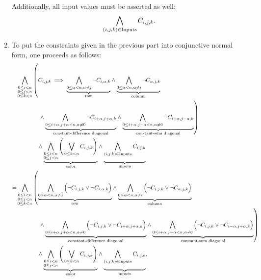 \documentclass[journal,onecolumn]{IEEEtran}
\begin{document}
\begin{enumerate}
	Additionally, all input values must be asserted as well:
	\[
	\bigwedge_{(i, j, k) \in \textnormal{Inputs}} C_{i, j, k}.
	\]
	\item To put the constraints given in the previous part into conjunctive normal form, one proceeds as follows:
	\begin{align*}
	&\bigwedge_{\substack{0 \le i < n \\ 0 \le j < n \\ 0 \le k < n}} \left(C_{i, j, k} \implies {\underbrace{\bigwedge_{0 \le \alpha < n, \alpha \ne j} \lnot C_{i, \alpha, k}}_{\textnormal{row}}} \land {\underbrace{\bigwedge_{0 \le \alpha < n, \alpha \ne i} \lnot C_{\alpha, j, k}}_{\textnormal{column}}}\right. \\
	&\left. \qquad \qquad \! \! {} \land {\underbrace{\bigwedge_{0 \le i+\alpha, j+\alpha < n, \alpha \ne 0} \lnot C_{i+\alpha, j+\alpha, k}}_{\textnormal{constant-difference diagonal}}} \land {\underbrace{\bigwedge_{0 \le i+\alpha, j-\alpha < n, \alpha \ne 0} \lnot C_{i+\alpha, j-\alpha, k}}_{\textnormal{constant-sum diagonal}}}\right) \\
	&\qquad \qquad \! \! {} \land {\underbrace{\bigwedge_{\substack{0 \le i < n \\ 0 \le j < n}} \Bigg(\bigvee_{0 \le k < n} C_{i, j, k}\Bigg)}_{\textnormal{color}}} \land {\underbrace{\bigwedge_{(i, j, k) \in \textnormal{Inputs}} C_{i, j, k} \vphantom{\bigwedge_{\substack{0 \le j < n \\ 0 \le k < n}}}}_{\textnormal{inputs}}} \\
	=&\bigwedge_{\substack{0 \le i < n \\ 0 \le j < n \\ 0 \le k < n}} \left({\underbrace{\bigwedge_{0 \le \alpha < n, \alpha \ne j} \Big(\lnot C_{i, j, k} \lor \lnot C_{i, \alpha, k} \Big)}_{\textnormal{row}}} \land {\underbrace{\bigwedge_{0 \le \alpha < n, \alpha \ne i} \Big(\lnot C_{i, j, k} \lor \lnot C_{\alpha, j, k}\Big)}_{\textnormal{column}}} \right.\\
	&\left. \qquad \qquad \! \! {}  \land {\underbrace{\bigwedge_{0 \le i+\alpha, j+\alpha < n, \alpha \ne 0} \Big( \lnot C_{i, j, k} \lor \lnot C_{i + \alpha, j+\alpha, k}\Big)}_{\textnormal{constant-difference diagonal}}} \land {\underbrace{\bigwedge_{0 \le i+\alpha, j-\alpha < n, \alpha \ne 0} \Big( \lnot C_{i, j, k} \lor \lnot C_{i-\alpha, j+\alpha, k} \Big)}_{\textnormal{constant-sum diagonal}}}\right)\\
	&\qquad \qquad \! \! {} \land {\underbrace{\bigwedge_{\substack{0 \le i < n \\ 0 \le j < n}} \Bigg(\bigvee_{0 \le k < n} C_{i, j, k}\Bigg)}_{\textnormal{color}}} \land {\underbrace{\bigwedge_{(i, j, k) \in \textnormal{Inputs}} C_{i, j, k} \vphantom{\bigwedge_{\substack{0 \le j < n \\ 0 \le k < n}}}}_{\textnormal{inputs}}},

\end{align*}
\end{enumerate}
\end{document}

